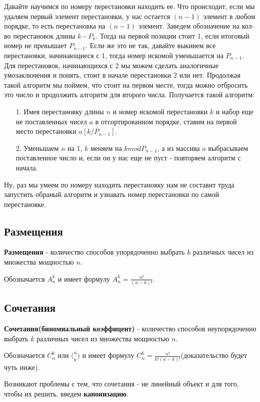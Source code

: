 Давайте научимся по номеру перестановки находить ее. Что происходит, если мы удаляем первый элемент перестановки, у нас остается $(n-1)$ элемент в любом порядке, то есть перестановка на $(n-1)$ элемент. Заведем обозначение на кол-во перестановок длины $k$ - $P_k$. Тогда на первой позиции стоит 1, если итоговый номер не превышает $P_{n-1}$. Если же это не так, давайте выкинем все перестановки, начинающиеся с 1, тогда номер искомой уменьшается на $P_{n-1}$. Для перестановок, начинающихся с 2 мы можем сделать аналогичные умозаключения и понять, стоит в начале перестановки 2 или нет. Продолжая такой алгоритм мы поймем, что стоит на первом месте, тогда можно отбросить это число и продолжить алгоритм для второго числа. Получается такой алгоритм:
\begin{enumerate}
    \item [1.] Имея перестановку длины $n$ и номер искомой перестановки $k$ и набор еще не поставленных чисел $a$ в отсортированном порядке, ставим на первой место перестановки $a[k / P_{n - 1}]$.
    \item[2.] Уменьшаем $n$ на 1, $k$ меняем на $k mod P_{n - 1}$, а из массива $a$ выбрасываем поставленное число и, если он у нас еще не пуст - повторяем алгоритм с начала.
\end{enumerate} 

Ну, раз мы умеем по номеру находить перестановку нам не составит труда запустить обраный алгоритм и узнавать номер перестановки по самой перестановке.

\subsection{Размещения}
\textbf{Размещения} - количество способов упорядоченно выбрать $k$ различных чисел из множества мощностью $n$.

Обозначается $A_n^k$ и имеет формулу $A_n^k = \frac{n!}{(n-k)!}$.

\subsection{Сочетания}
\textbf{Сочетания(биномиальный коэффицент)} - количество способов неупорядоченно выбрать $k$ различных чисел из множества мощностью $n$.

Обозначается $C_n^k$ или $\big(_k^n\big)$ и имеет формулу $C_n^k = \frac{n!}{k!(n-k)!}$(доказательство будет чуть ниже).

Возникают проблемы с тем, что сочетания - не линейный объект и для того, чтобы их решить, введем \textbf{канонизацию}.

